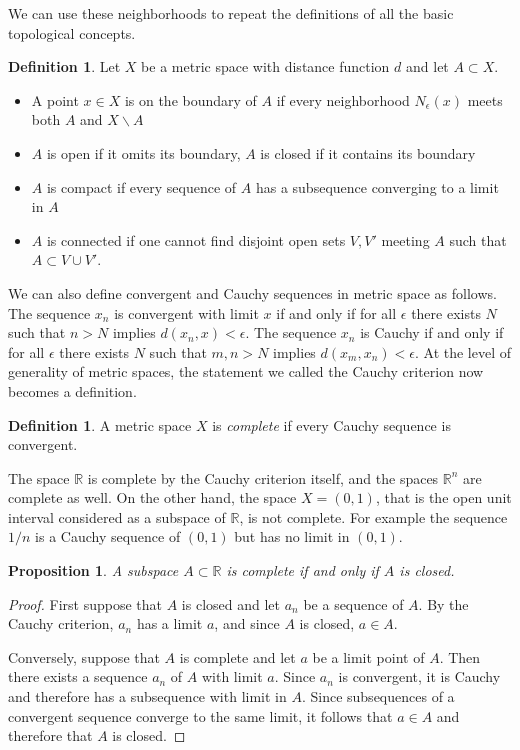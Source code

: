 \documentclass[11pt,oneside]{amsbook}
\newcommand{\R}{\mathbb R}
\renewcommand{\setminus}{\smallsetminus}
\theoremstyle{definition}
\theoremstyle{plain}
\newtheorem{proposition}[theorem]{Proposition}
\theoremstyle{definition}
\newtheorem{definition}[theorem]{Definition}
\theoremstyle{remark}
\numberwithin{equation}{section}
\numberwithin{figure}{section}
\begin{document}
We can use these neighborhoods to repeat the definitions of all the basic topological concepts.

\begin{definition}
  Let $X$ be a metric space with distance function $d$ and let $A\subset X$.
  \begin{itemize}
  \item A point $x\in X$ is on the boundary of $A$ if every neighborhood $N_\epsilon(x)$ meets both $A$ and $X\setminus A$
  \item $A$ is open if it omits its boundary, $A$ is closed if it contains its boundary
  \item $A$ is compact if every sequence of $A$ has a subsequence converging to a limit in $A$
  \item $A$ is connected if one cannot find disjoint open sets $V,V'$ meeting $A$ such that $A\subset V\cup V'$.
  \end{itemize}
\end{definition}


We can also define convergent and Cauchy sequences in metric space as follows. The sequence $x_n$ is convergent with limit $x$ if and only if for all $\epsilon$ there exists $N$ such that $n>N$ implies $d(x_n,x)<\epsilon$. The sequence $x_n$ is Cauchy if and only if for all $\epsilon$ there exists $N$ such that $m,n>N$ implies $d(x_m,x_n)<\epsilon$. At the level of generality of metric spaces, the statement we called the Cauchy criterion now becomes a definition.

\begin{definition}
  A metric space $X$ is \emph{complete} if every Cauchy sequence is convergent.
\end{definition}

The space $\R$ is complete by the Cauchy criterion itself, and the spaces $\R^n$ are complete as well. On the other hand, the space $X=(0,1)$, that is the open unit interval considered as a subspace of $\R$, is not complete. For example the sequence $1/n$ is a Cauchy sequence of $(0,1)$ but has no limit in $(0,1)$.

\begin{proposition}
  A subspace $A\subset\R$ is complete if and only if $A$ is closed.
\end{proposition}

\begin{proof}
  First suppose that $A$ is closed and let $a_n$ be a sequence of $A$. By the Cauchy criterion, $a_n$ has a limit $a$, and since $A$ is closed, $a\in A$. 

  Conversely, suppose that $A$ is complete and let $a$ be a limit point of $A$. Then there exists a sequence $a_n$ of $A$ with limit $a$. Since $a_n$ is convergent, it is Cauchy and therefore has a subsequence with limit in $A$. Since subsequences of a convergent sequence converge to the same limit, it follows that $a\in A$ and therefore that $A$ is closed.
\end{proof}
\end{document}
